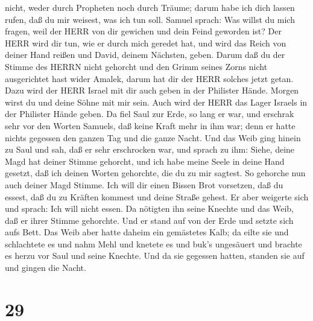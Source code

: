 nicht, weder durch Propheten noch durch Träume; darum habe ich dich
lassen rufen, daß du mir weisest, was ich tun soll.  Samuel
sprach: Was willst du mich fragen, weil der HERR von dir gewichen und
dein Feind geworden ist?  Der HERR wird dir tun, wie er
durch mich geredet hat, und wird das Reich von deiner Hand reißen und
David, deinem Nächsten, geben.  Darum daß du der Stimme des
HERRN nicht gehorcht und den Grimm seines Zorns nicht ausgerichtet hast
wider Amalek, darum hat dir der HERR solches jetzt getan. 
Dazu wird der HERR Israel mit dir auch geben in der Philister Hände.
Morgen wirst du und deine Söhne mit mir sein. Auch wird der HERR das
Lager Israels in der Philister Hände geben.  Da fiel Saul
zur Erde, so lang er war, und erschrak sehr vor den Worten Samuels, daß
keine Kraft mehr in ihm war; denn er hatte nichts gegessen den ganzen
Tag und die ganze Nacht.  Und das Weib ging hinein zu Saul
und sah, daß er sehr erschrocken war, und sprach zu ihm: Siehe, deine
Magd hat deiner Stimme gehorcht, und ich habe meine Seele in deine Hand
gesetzt, daß ich deinen Worten gehorchte, die du zu mir sagtest.
 So gehorche nun auch deiner Magd Stimme. Ich will dir
einen Bissen Brot vorsetzen, daß du essest, daß du zu Kräften kommest
und deine Straße gehest.  Er aber weigerte sich und sprach:
Ich will nicht essen. Da nötigten ihn seine Knechte und das Weib, daß er
ihrer Stimme gehorchte. Und er stand auf von der Erde und setzte sich
aufs Bett.  Das Weib aber hatte daheim ein gemästetes Kalb;
da eilte sie und schlachtete es und nahm Mehl und knetete es und buk's
ungesäuert  und brachte es herzu vor Saul und seine
Knechte. Und da sie gegessen hatten, standen sie auf und gingen die
Nacht.

\hypertarget{section-28}{%
\section{29}\label{section-28}}

